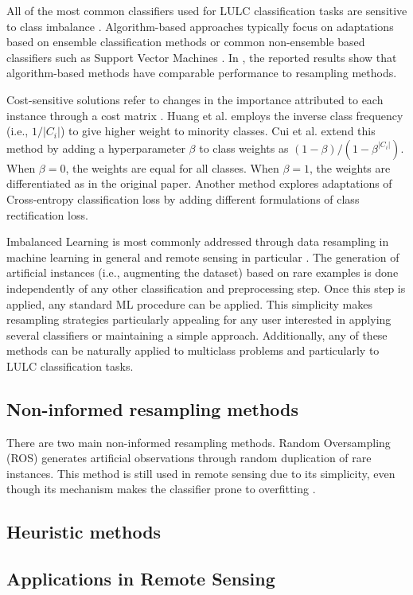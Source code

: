 \documentclass[parskip=full]{scrartcl}
\begin{document}
All of the most common classifiers used for LULC classification tasks
\cite{Khatami2016, Gavade2019} are sensitive to class imbalance \cite{Blagus2010}.
Algorithm-based approaches typically focus on adaptations based on ensemble
classification methods \cite{Mellor2015} or common non-ensemble based
classifiers such as Support Vector Machines \cite{Shao2014}. In
\cite{Lee2016}, the reported results show that algorithm-based methods
have comparable performance to resampling methods.

Cost-sensitive solutions refer to changes in the importance attributed to each
instance through a cost matrix \cite{Huang2016,Cui2019,Dong2017}. Huang et al.
\cite{Huang2016} employs the inverse class frequency (i.e.,
$1/|C_i|$) to give higher weight to minority classes. Cui et al.
\cite{Cui2019} extend this method by adding a hyperparameter
$\beta$ to class weights as $(1-\beta)/(1-\beta^{|C_i|})$. When
$\beta=0$, the weights are equal for all classes. When
$\beta=1$, the weights are differentiated as in the original paper.
Another method \cite{Dong2017} explores adaptations of Cross-entropy
classification loss by adding different formulations of class rectification
loss.

Imbalanced Learning is most commonly addressed through data resampling in
machine learning in general and remote sensing in particular
\cite{Feng2019}. The generation of artificial instances (i.e.,
augmenting the dataset) based on rare examples is done independently of any
other classification and preprocessing step. Once this step is applied, any
standard ML procedure can be applied. This simplicity makes resampling
strategies particularly appealing for any user interested in applying several
classifiers or maintaining a simple approach. Additionally, any of these
methods can be naturally applied to multiclass problems and particularly to
LULC classification tasks.

\subsection{Non-informed resampling methods}

There are two main non-informed resampling methods. Random Oversampling (ROS)
generates artificial observations through random duplication of rare instances.
This method is still used in remote sensing \cite{Sharififar2019, Hounkpatin2018} due to its
simplicity, even though its mechanism makes the classifier prone to overfitting
\cite{Krawczyk2016}.

\subsection{Heuristic methods}



\subsection{Applications in Remote Sensing}





\end{document}
